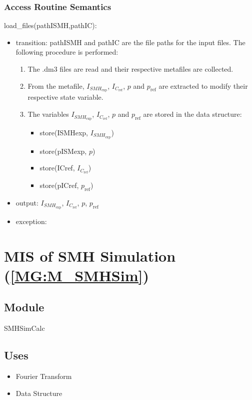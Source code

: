 \documentclass[12pt, titlepage]{article}
\begin{document}
\subsubsection{Access Routine Semantics}

\noindent load{\_}files(pathISMH,pathIC):
\begin{itemize}
\item transition: pathISMH and pathIC are the file paths for the input files. The following procedure is performed:
\begin{enumerate}
\item The .dm3 files are read and their respective  metafiles are collected.
\item From the metafile, $I_{\mathit{SMH}_{\text{exp}}}$, $I_{C_{\text{ref}}}$, $p$ and $p_{\text{ref}}$ are extracted to modify their respective state variable.
\item The variables $I_{\mathit{SMH}_{\text{exp}}}$, $I_{C_{\text{ref}}}$, $p$ and $p_{\text{ref}}$ are stored in the data structure:
\begin{itemize}
\item store(ISMHexp, $I_{\mathit{SMH}_{\text{exp}}}$)
\item store(pISMexp, $p$)
\item store(ICref, $I_{C_{\text{ref}}}$)
\item store(pICref, $p_{\text{ref}}$)
\end{itemize}
\end{enumerate}  
\item output:  $I_{\mathit{SMH}_{\text{exp}}}$, $I_{C_{\text{ref}}}$, $p$, $p_{\text{ref}}$ 
\item exception:  
\end{itemize}

\section{MIS of SMH Simulation (\texorpdfstring{\cref{MG:M_SMHSim}}))} \label{MIS_SHMSim}

\subsection{Module}
SMHSimCalc
\subsection{Uses}
\begin{itemize}
\item Fourier Transform
\item Data Structure
\end{itemize}
\end{document}
